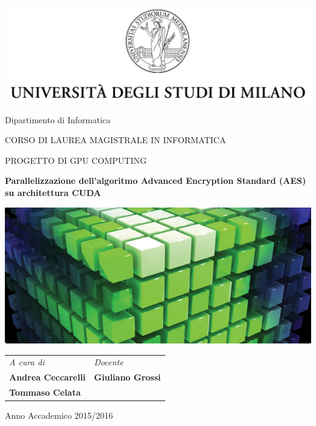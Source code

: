 \documentclass[a4paper,10pt,oneside]{book}
\begin{document}
\begin{titlepage}
\begin{center}



\centering

\includegraphics[width=1\textwidth]{img/logo.jpg}


Dipartimento di Informatica
\vspace{30pt}

CORSO DI LAUREA MAGISTRALE IN INFORMATICA
\vspace{30pt}


PROGETTO DI GPU COMPUTING
\bigskip

{\huge\textbf{Parallelizzazione dell'algoritmo Advanced Encryption Standard (AES) su architettura CUDA}}

\vspace{20pt}


\centering

\includegraphics[width=1\textwidth]{img/cudablock.jpg}
\bigskip



\vspace{20pt}

\begin{tabular}{p{230pt}l}
\textit{A cura di} & \textit{Docente} \\
\textbf{Andrea Ceccarelli} & \textbf{Giuliano Grossi}
\\
\textbf{Tommaso Celata}

\end{tabular}
\vspace{25pt}

Anno Accademico 2015/2016
\end{center}
\end{titlepage}



\tableofcontents








\end{document}
